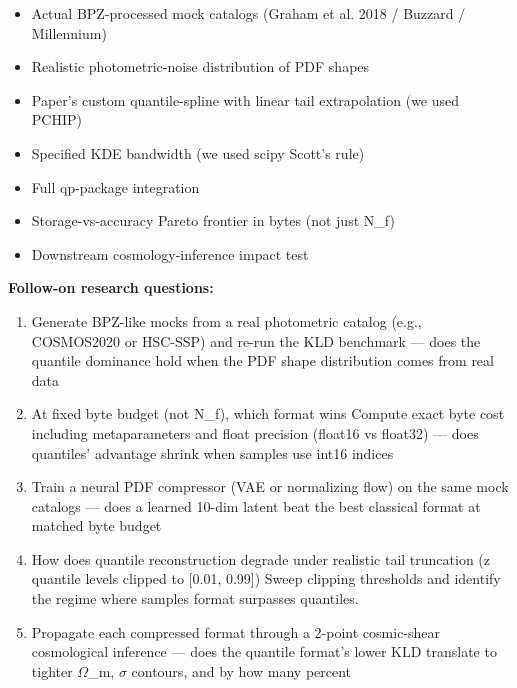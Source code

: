\begin{itemize}[leftmargin=1.4em,itemsep=0.2em,topsep=0.2em]
\item Actual BPZ-processed mock catalogs (Graham et al. 2018 / Buzzard / Millennium)
\item Realistic photometric-noise distribution of PDF shapes
\item Paper's custom quantile-spline with linear tail extrapolation (we used PCHIP)
\item Specified KDE bandwidth (we used scipy Scott's rule)
\item Full qp-package integration
\item Storage-vs-accuracy Pareto frontier in bytes (not just N\_f)
\item Downstream cosmology-inference impact test
\end{itemize}\noindent\textbf{Follow-on research questions:}
\begin{enumerate}[leftmargin=1.6em,itemsep=0.2em,topsep=0.2em,label=Q\arabic*.]
\item Generate BPZ-like mocks from a real photometric catalog (e.g., COSMOS2020 or HSC-SSP) and re-run the KLD benchmark --- does the quantile dominance hold when the PDF shape distribution comes from real data
\item At fixed byte budget (not N\_f), which format wins Compute exact byte cost including metaparameters and float precision (float16 vs float32) --- does quantiles' advantage shrink when samples use int16 indices
\item Train a neural PDF compressor (VAE or normalizing flow) on the same mock catalogs --- does a learned 10-dim latent beat the best classical format at matched byte budget
\item How does quantile reconstruction degrade under realistic tail truncation (z quantile levels clipped to [0.01, 0.99]) Sweep clipping thresholds and identify the regime where samples format surpasses quantiles.
\item Propagate each compressed format through a 2-point cosmic-shear cosmological inference --- does the quantile format's lower KLD translate to tighter $\Omega$\_m, $\sigma$ contours, and by how many percent
\end{enumerate}

